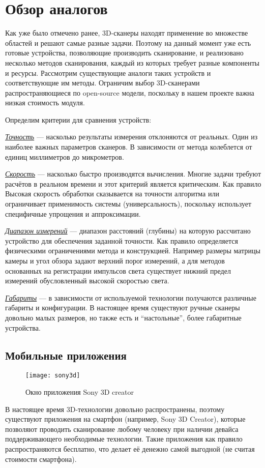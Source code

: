 \chapter{Обзор аналогов}
    Как уже было отмечено ранее, 3D-сканеры находят применение во множестве областей и решают самые разные задачи. Поэтому на данный момент уже есть готовые устройства, позволяющие производить сканирование, и реализовано несколько методов сканирования, каждый из которых требует разные компоненты и ресурсы. Рассмотрим существующие аналоги таких устройств и соответствующие им методы. Ограничим выбор 3D-сканерами распространяющиеся по open-source модели, поскольку в нашем проекте важна низкая стоимость модуля.
    
    Определим критерии для сравнения устройств:
    
    \underline{\textit{Точность}} --- насколько результаты измерения отклоняются от реальных. Один из наиболее важных параметров сканеров. В зависимости от метода колеблется от единиц миллиметров до микрометров.
    
    \underline{\textit{Скорость}} --- насколько быстро производятся вычисления. Многие задачи требуют расчётов в реальном времени и этот критерий является критическим. Как правило Высокая скорость обработки сказывается на точности алгоритма или ограничивает применимость системы (универсальность), поскольку использует специфичные упрощения и аппроксимации.
    
    \underline{\textit{Диапазон измерений}} --- диапазон расстояний (глубины) на которую рассчитано устройство для обеспечения заданной точности. Как правило определяется физическими ограничениями метода и конструкцией. Например размеры матрицы камеры и угол обзора задают верхний порог измерений, а для методов основанных на регистрации импульсов света существует нижний предел измерений обусловленный высокой скоростью света.
    
    \underline{\textit{Габариты}} --- в зависимости от используемой технологии получаются различные габариты и конфигурации. В настоящее время существуют ручные сканеры довольно малых размеров, но также есть и “настольные”, более габаритные устройства.

    \section{Мобильные приложения}
        \begin{figure}[!ht]
            \centering
            \texttt{[image: sony3d]}\label{pic:sony3d}
            \caption{Окно приложения Sony 3D creator}
        \end{figure}
        В настоящее время 3D-технологии довольно распространены, поэтому существуют приложения на смартфон (например, Sony 3D Creator), которые позволяют проводить сканирование любому человеку при наличии девайса поддерживающего необходимые технологии. Такие приложения как правило распространяются бесплатно, что делает её денежно самой выгодной (не считая стоимости смартфона).


